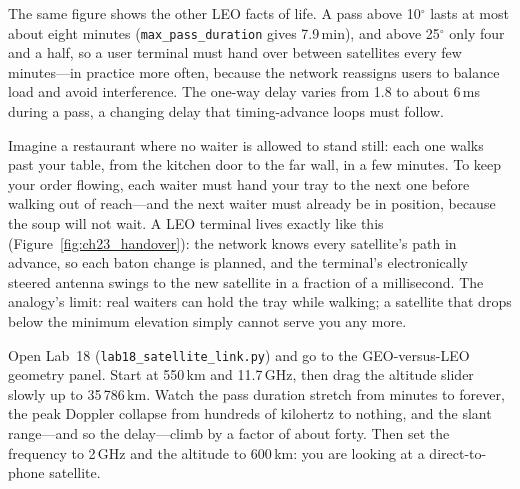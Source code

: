 
The same figure shows the other LEO facts of life. A pass above 10$^\circ$ lasts at most
about eight minutes (\texttt{max\_pass\_duration} gives 7.9\,min), and above 25$^\circ$ only
four and a half, so a user terminal must hand over between satellites every few minutes---in
practice more often, because the network reassigns users to balance load and avoid
interference. The one-way delay varies from 1.8 to about 6\,ms during a pass, a changing delay
that timing-advance loops must follow.

\begin{analogy}
Imagine a restaurant where no waiter is allowed to stand still: each one walks past your table,
from the kitchen door to the far wall, in a few minutes. To keep your order flowing, each waiter
must hand your tray to the next one before walking out of reach---and the next waiter must already
be in position, because the soup will not wait. A LEO terminal lives exactly like this
(Figure~\ref{fig:ch23_handover}): the network knows every satellite's path in advance, so each
baton change is planned, and the terminal's electronically steered antenna swings to the new
satellite in a fraction of a millisecond. The analogy's limit: real waiters can hold the tray
while walking; a satellite that drops below the minimum elevation simply cannot serve you any
more.
\end{analogy}


\begin{tryit}
Open Lab~18 (\texttt{lab18\_satellite\_link.py}) and go to the GEO-versus-LEO geometry panel. Start
at 550\,km and 11.7\,GHz, then drag the altitude slider slowly up to 35\,786\,km. Watch the pass
duration stretch from minutes to forever, the peak Doppler collapse from hundreds of kilohertz to
nothing, and the slant range---and so the delay---climb by a factor of about forty. Then set the
frequency to 2\,GHz and the altitude to 600\,km: you are looking at a direct-to-phone satellite.
\end{tryit}

